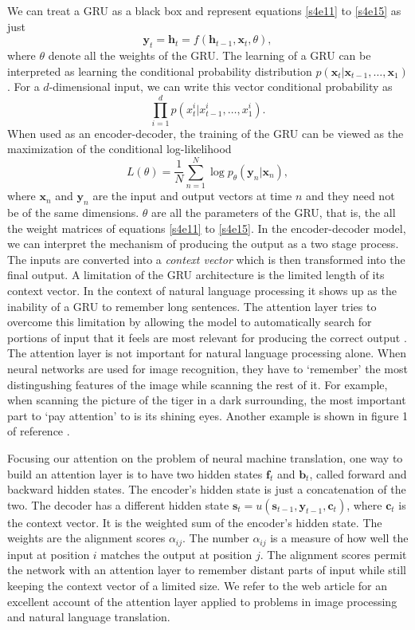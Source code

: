 \documentclass[11pt]{article}
\numberwithin{equation}{section}
\renewcommand{\vec}{\mathbf}
\begin{document}
We can treat a GRU as a black box and represent equations \eqref{s4e11} to
\eqref{s4e15} as just
\begin{equation}\label{s4e16}
\vec{y}_t = \vec{h}_t = f(\vec{h}_{t-1}, \vec{x}_t, \theta),
\end{equation}
where $\theta$ denote all the weights of the GRU. The learning of a GRU can be 
interpreted as learning the conditional probability distribution 
$p(\vec{x}_t | \vec{x}_{t-1}, \ldots, \vec{x}_1)$. For a $d$-dimensional input, 
we can write this vector conditional probability as
\[
\prod_{i=1}^d p(x^i_t | x^i_{t-1}, \ldots, x^i_1).
\]
When used as an encoder-decoder, the training of the GRU can be viewed as the
maximization of the conditional log-likelihood
\begin{equation}\label{s4e17}
L(\theta) = \frac{1}{N}\sum_{n=1}^N\log p_\theta(\vec{y}_n|\vec{x}_n),
\end{equation}
where $\vec{x}_n$ and $\vec{y}_n$ are the input and output vectors at time $n$
and they need not be of the same dimensions. $\theta$ are all the parameters 
of the GRU, that is, the all the weight matrices of equations \eqref{s4e11}
to \eqref{s4e15}. In the encoder-decoder model, we can interpret the 
mechanism of producing the output as a two stage process. The inputs are
converted into a \emph{context vector} which is then transformed into the final
output. A limitation of the GRU architecture is the limited length of its
context vector. In the context of natural language processing it shows up as
the inability of a GRU to remember long sentences. The attention layer tries
to overcome this limitation by allowing the model to automatically search for
portions of input that it feels are most relevant for producing the correct
output \cite{bahdanau2014neural}. The attention layer is not important for 
natural language processing alone. When neural networks are used for image
recognition, they have to `remember' the most distingushing features of the
image while scanning the rest of it. For example, when scanning the picture of
the tiger in a dark surrounding, the most important part to `pay attention' to
is its shining eyes. Another example is shown in figure 1 of reference 
\cite{weng2018attention}.

Focusing our attention on the problem of neural machine translation, one way
to build an attention layer is to have two hidden states $\vec{f}_t$ and 
$\vec{b}_t$, called forward and backward hidden states. The encoder's hidden
state is just a concatenation of the two. The decoder has a different hidden
state $\vec{s}_t = u(\vec{s}_{t-1}, \vec{y}_{t-1}, \vec{c}_t)$, where 
$\vec{c}_t$ is the context vector. It is the weighted sum of the encoder's
hidden state. The weights are the alignment scores $\alpha_{ij}$. The number
$\alpha_{ij}$ is a measure of how well the input at position $i$ matches the
output at position $j$. The alignment scores permit the network with an 
attention layer to remember distant parts of input while still keeping the
context vector of a limited size. We refer to the web article 
\cite{weng2018attention} for an excellent account of the attention layer 
applied to problems in image processing and natural language translation.


\end{document}
